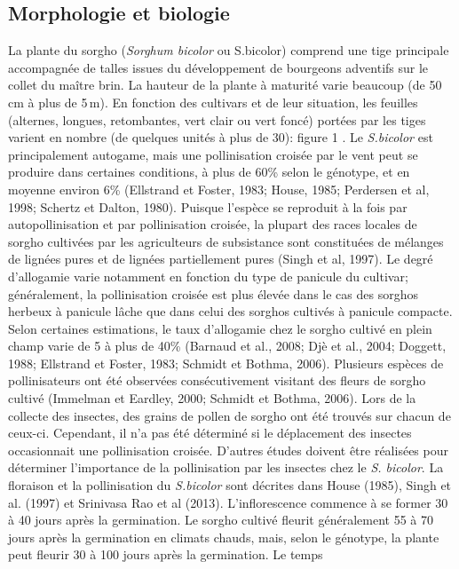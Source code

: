 \documentclass[a4paper,11pt]{article}
\begin{document}
 
\subsection{Morphologie et biologie} La plante du sorgho
(\emph{Sorghum bicolor} ou S.bicolor) comprend une tige principale
accompagnée de talles issues du développement de bourgeons adventifs
sur le collet du maître brin. La hauteur de la plante à maturité varie
beaucoup (de 50\,cm à plus de 5\,m). En fonction des cultivars et de
leur situation, les feuilles (alternes, longues, retombantes, vert
clair ou vert foncé) portées par les tiges varient en nombre (de
quelques unités à plus de 30): figure 1 \cite{BARRO_KONDOMBO_2010}. Le
\emph{S.bicolor} est principalement autogame, mais une pollinisation
croisée par le vent peut se produire dans certaines conditions, à plus
de 60\% selon le génotype, et en moyenne environ 6\% (Ellstrand et
Foster, 1983; House, 1985; Perdersen et al, 1998; Schertz et Dalton,
1980). Puisque l’espèce se reproduit à la fois par autopollinisation
et par pollinisation croisée, la plupart des races locales de sorgho
cultivées par les agriculteurs de subsistance sont constituées de
mélanges de lignées pures et de lignées partiellement pures (Singh et
al, 1997). Le degré d’allogamie varie notamment en fonction du type de
panicule du cultivar; généralement, la pollinisation croisée est plus
élevée dans le cas des sorghos herbeux à panicule lâche que dans celui
des sorghos cultivés à panicule compacte. Selon certaines estimations,
le taux d’allogamie chez le sorgho cultivé en plein champ varie de 5 à
plus de 40\% (Barnaud et al., 2008; Djè et al., 2004; Doggett, 1988;
Ellstrand et Foster, 1983; Schmidt et Bothma, 2006). Plusieurs espèces
de pollinisateurs ont été observées consécutivement visitant des
fleurs de sorgho cultivé (Immelman et Eardley, 2000; Schmidt et
Bothma, 2006). Lors de la collecte des insectes, des grains de pollen
de sorgho ont été trouvés sur chacun de ceux-ci. Cependant, il n’a pas
été déterminé si le déplacement des insectes occasionnait une
pollinisation croisée. D’autres études doivent être réalisées pour
déterminer l’importance de la pollinisation par les insectes chez le
\emph{S. bicolor}. La floraison et la pollinisation du \emph{S.bicolor} sont
décrites dans House (1985), Singh et al. (1997) et Srinivasa Rao et al
(2013). L’inflorescence commence à se former 30 à 40 jours après la
germination. Le sorgho cultivé fleurit généralement 55 à 70 jours
après la germination en climats chauds, mais, selon le génotype, la
plante peut fleurir 30 à 100 jours après la germination. Le temps
\end{document}
